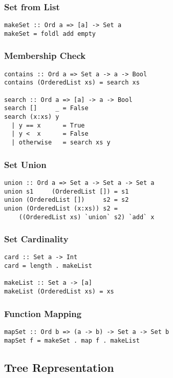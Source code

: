 \documentclass[dvipsnames]{beamer}
\theoremstyle{plain}
\begin{document}
\begin{frame}[fragile]
  \frametitle{Set from List}

  \begin{lstlisting}
makeSet :: Ord a => [a] -> Set a
makeSet = foldl add empty
  \end{lstlisting}
\end{frame}

\begin{frame}[fragile]
  \frametitle{Membership Check}

  \begin{lstlisting}
contains :: Ord a => Set a -> a -> Bool
contains (OrderedList xs) = search xs

search :: Ord a => [a] -> a -> Bool
search []     _ = False
search (x:xs) y
  | y == x      = True
  | y <  x      = False
  | otherwise   = search xs y
  \end{lstlisting}
\end{frame}

\begin{frame}[fragile]
  \frametitle{Set Union}

  \begin{lstlisting}[deletekeywords={union}]
union :: Ord a => Set a -> Set a -> Set a
union s1     (OrderedList []) = s1
union (OrderedList [])     s2 = s2
union (OrderedList (x:xs)) s2 =
    ((OrderedList xs) `union` s2) `add` x
  \end{lstlisting}
\end{frame}

\begin{frame}[fragile]
  \frametitle{Set Cardinality}

  \begin{lstlisting}
card :: Set a -> Int
card = length . makeList

makeList :: Set a -> [a]
makeList (OrderedList xs) = xs
  \end{lstlisting}
\end{frame}

\begin{frame}[fragile]
  \frametitle{Function Mapping}

  \begin{lstlisting}
mapSet :: Ord b => (a -> b) -> Set a -> Set b
mapSet f = makeSet . map f . makeList
  \end{lstlisting}
\end{frame}

\subsection{Tree Representation}
\end{document}
